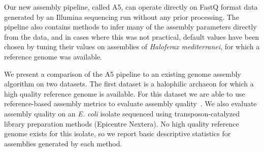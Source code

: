 \documentclass{bioinfo}
\begin{document}
Our new assembly pipeline, called A5, can operate directly on FastQ format data generated by an Illumina sequencing run
without any prior processing. The pipeline also contains methods to infer many of the assembly parameters directly
from the data, and in cases where this was not practical, default values have been chosen by tuning their values on 
assemblies of \textit{Haloferax mediterranei}, for which a reference genome was available.

We present a comparison of the A5 pipeline to an existing genome assembly algorithm on two datasets. The first dataset
is a halophilic archaeon for which a high quality reference genome is available. For this dataset we are able to use
reference-based assembly metrics to evaluate assembly quality~\citep{Darling2011}. We also evaluate assembly quality on an 
\textit{E. coli} isolate sequenced using transposon-catalyzed library preparation methods (Epicentre Nextera). 
No high quality reference genome exists for this isolate, so we report basic descriptive statistics for assemblies
generated by each method.  
\end{document}
